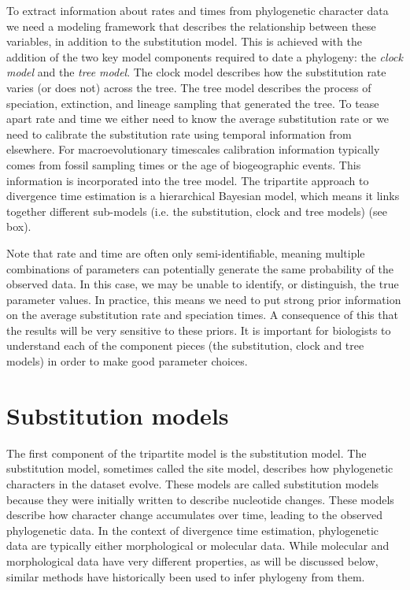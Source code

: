 \documentclass[11pt]{article}
\begin{document}
To extract information about rates and times from phylogenetic character data we need a modeling framework that describes the  relationship between these variables, in addition to the substitution model.
This is achieved with the addition of the two key model components required to date a phylogeny: the \textit{clock model} and the \textit{tree model}.
The clock model describes how the substitution rate varies (or does not) across the tree.
The tree model describes the process of speciation, extinction, and lineage sampling that generated the tree.
To tease apart rate and time we either need to know the average substitution rate or we need to calibrate the substitution rate using temporal information from elsewhere.
For macroevolutionary timescales calibration information typically comes from fossil sampling times or the age of biogeographic events. This information is incorporated into the tree model.
The tripartite approach to divergence time estimation is a hierarchical Bayesian model, which means it links together different sub-models (i.e. the substitution, clock and tree models) (see box).

Note that rate and time are often only semi-identifiable, meaning multiple combinations of parameters can potentially generate the same probability of the observed data.
In this case, we may be unable to identify, or distinguish, the true parameter values.
In practice, this means we need to put strong prior information on the average substitution rate and speciation times. 
A consequence of this that the results will be very sensitive to these priors.
It is important for biologists to understand each of the component pieces (the substitution, clock and tree models) in order to make good parameter choices.

\section{Substitution models}

The first component of the tripartite model is the substitution model.
The substitution model, sometimes called the site model, describes how phylogenetic characters in the dataset evolve.
These models are called substitution models because they were initially written to describe nucleotide changes.
These models describe how character change accumulates over time, leading to the observed phylogenetic data.
In the context of divergence time estimation, phylogenetic data are typically either morphological or molecular data. 
While molecular and morphological data have very different properties, as will be discussed below, similar methods have historically been used to infer phylogeny from them.
\end{document}
